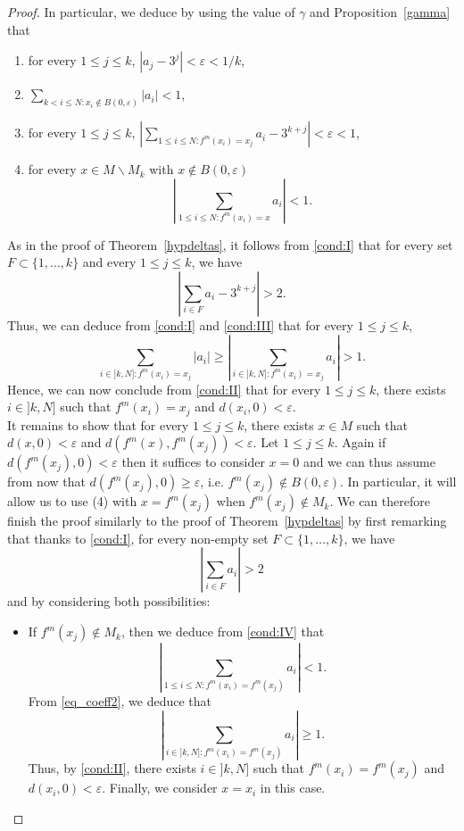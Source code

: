 \documentclass[12pt,english]{amsart}
\numberwithin{equation}{section}
\theoremstyle{plain}
\theoremstyle{definition}
\begin{document}
\begin{proof}
In particular, we deduce by using the value of $\gamma$ and   Proposition~\ref{gamma} that
\begin{enumerate}
\item for every $1\le j\le k$, $\displaystyle |a_j-3^j|<\varepsilon<1/k$, \label{cond:I}
\item  $\displaystyle \sum_{k< i\le N: x_i\notin B(0,\varepsilon)}|a_i|<1$,\label{cond:II}
\item for every $1\le j\le k$, $\displaystyle\left|\sum_{1\le i\le N:f^m(x_i)=x_j}a_i-3^{k+j}\right|<\varepsilon<1$,\label{cond:III}
\item for every $x\in M\backslash M_k$ with $x\notin B(0,\varepsilon)$
\[\displaystyle\left|\sum_{1\le i\le N:f^m(x_i)=x}a_i\right|<1.\]\label{cond:IV}
\end{enumerate}
As in the proof of Theorem~\ref{hypdeltas}, it follows from \eqref{cond:I} that for every set $F\subset \{1,\dots,k\}$ and every $1\le j\le k$, we have
\[\left|\sum_{i\in F} a_i-3^{k+j}\right|> 2.\]
Thus, we can deduce from \eqref{cond:I}  and \eqref{cond:III} that for every $1\le j\le k$, 
\[\sum_{i\in ]k,N]:f^m(x_i)=x_j}|a_i|\ge \left|\sum_{i\in ]k,N]:f^m(x_i)=x_j}a_i\right|>1.\]
Hence, we can now conclude from \eqref{cond:II} that for every $1\le j\le k$, there exists $i\in ]k,N]$ such that $f^m(x_i)=x_j$ and $d(x_i,0)<\varepsilon$.\\


It remains to show that for every $1\le j\le k$, there exists $x\in M$ such that $d(x,0)<\varepsilon$  and $d(f^m(x),f^m(x_j))<\varepsilon$.  
Let $1\le j\le k$. 
Again if $d(f^m(x_j),0)<\varepsilon$ then it suffices to consider $x=0$ and we can thus assume from now that $d(f^m(x_j),0)\ge \varepsilon$, i.e. $f^m(x_j)\notin B(0,\varepsilon)$. In particular, it will allow us to use (4) with $x=f^m(x_j)$ when $f^m(x_j)\notin M_k$. We can therefore finish the proof similarly to the proof of Theorem~\ref{hypdeltas} by first remarking that thanks to \eqref{cond:I}, for every non-empty set $F\subset \{1,\dots,k\}$, we have
\begin{equation}\label{eq_coeff2}
    \left|\sum_{i\in F}a_i\right|> 2
\end{equation}
and by considering both possibilities:
\begin{itemize}
\item If $f^m(x_j)\notin M_k$, then we deduce from \eqref{cond:IV} that 
\[\left|\sum_{1\le i\le N:f^m(x_i)=f^m(x_j)}a_i\right|<1.\]
From \eqref{eq_coeff2}, we deduce that
\[\left|\sum_{i\in ]k,N]:f^m(x_i)=f^m(x_j)}a_i\right|\ge 1.\]
Thus, by \eqref{cond:II}, there exists $i\in ]k,N]$ such that $f^m(x_i)=f^m(x_j)$ and $d(x_i,0)<\varepsilon$. Finally, we consider $x=x_i$ in this case.


\end{itemize}
\end{proof}
\end{document}
